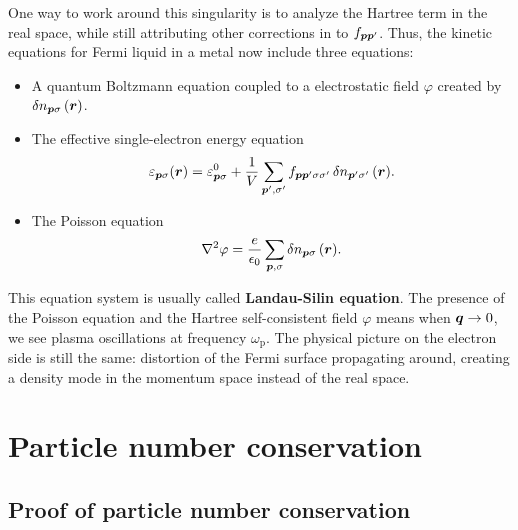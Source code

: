 \documentclass[hyperref, a4paper]{article}
\newcommand*{\concept}[1]{{\textbf{#1}}}
\begin{document}
One way to work around this singularity 
is to analyze the Hartree term in the real space, 
while still attributing other corrections in 
to $f_{\vb*{p} \vb*{p}'}$.
Thus, the kinetic equations for Fermi liquid in a metal 
now include three equations: 
\begin{itemize}
    \item A quantum Boltzmann equation coupled to a electrostatic field $\varphi$
    created by $\var{n}_{\vb*{p} \sigma}(\vb*{r})$.
    \item The effective single-electron energy equation 
    \begin{equation}
        \varepsilon_{\vb*{p} \sigma}(\vb*{r}) = \varepsilon^0_{\vb*{p} \sigma} 
        + \frac{1}{V} \sum_{\vb*{p}', \sigma'} 
        f_{\vb*{p} \vb*{p}' \sigma \sigma'} \var{n}_{\vb*{p}' \sigma'}(\vb*{r}).
    \end{equation}
    \item The Poisson equation 
    \begin{equation}
        \laplacian \varphi = \frac{e}{\epsilon_0} \sum_{\vb*{p}, \sigma} \var{n}_{\vb*{p} \sigma}(\vb*{r}).
    \end{equation}
\end{itemize}
This equation system is usually called \concept{Landau-Silin equation}.
The presence of the Poisson equation 
and the Hartree self-consistent field $\varphi$
means when $\vb*{q} \to 0$, 
we see plasma oscillations at frequency $\omega_{\text{p}}$.
The physical picture on the electron side 
is still the same: 
distortion of the Fermi surface propagating around,
creating a density mode in the momentum space instead of the real space.

\section{Particle number conservation}

\subsection{Proof of particle number conservation}

\printbibliography
\end{document}
